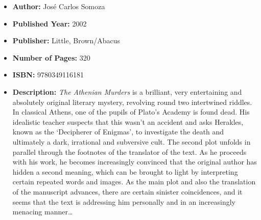 \documentclass{tufte-handout}
\begin{document}
\begin{itemize}
    \item[] \textbf{Author:} José Carlos Somoza
    \item[] \textbf{Published Year:} 2002
    \item[] \textbf{Publisher:} Little, Brown/Abacus
    \item[] \textbf{Number of Pages:} 320      
    \item[] \textbf{ISBN:} 9780349116181
    \item[] \textbf{Description:} \textit{The Athenian Murders} is a brilliant, very entertaining and absolutely original literary mystery, revolving round two intertwined riddles. In classical Athens, one of the pupils of Plato’s Academy is found dead. His idealistic teacher suspects that this wasn’t an accident and asks Herakles, known as the ‘Decipherer of Enigmas’, to investigate the death and ultimately a dark, irrational and subversive cult. The second plot unfolds in parallel through the footnotes of the translator of the text. As he proceeds with his work, he becomes increasingly convinced that the original author has hidden a second meaning, which can be brought to light by interpreting certain repeated words and images. As the main plot and also the translation of the manuscript advances, there are certain sinister coincidences, and it seems that the text is addressing him personally and in an increasingly menacing manner\ldots \end{itemize}
\end{document}
